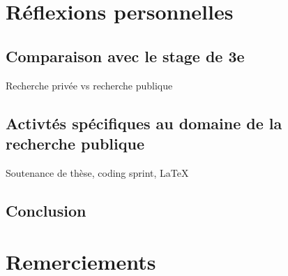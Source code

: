 \documentclass[12pt, letterpaper]{article}
\begin{document}
\section{Réflexions personnelles}
\subsection{Comparaison avec le stage de 3e}
Recherche privée vs recherche publique

\subsection{Activtés spécifiques au domaine de la recherche publique}
Soutenance de thèse, coding sprint, \LaTeX

\subsection{Conclusion}

\section{Remerciements}



\end{document}
